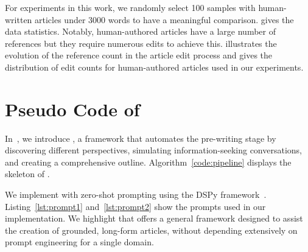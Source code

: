 For experiments in this work, we randomly select 100 samples with human-written articles under 3000 words to have a meaningful comparison.  gives the data statistics. Notably, human-authored articles have a large number of references but they require numerous edits to achieve this.  illustrates the evolution of the reference count in the article edit process and  gives the distribution of edit counts for human-authored articles used in our experiments.


\section{Pseudo Code of \system}
\label{appendix:pseudo_code}
In~, we introduce \system, a framework that automates the pre-writing stage by discovering different perspectives, simulating information-seeking conversations, and creating a comprehensive outline. Algorithm~\ref{code:pipeline} displays the skeleton of \system.

We implement \system with zero-shot prompting using the DSPy framework~\citep{khattab2023dspy}. Listing~\ref{lst:prompt1} and~\ref{lst:prompt2} show the prompts used in our implementation. We highlight that \system offers a general framework designed to assist the creation of grounded, long-form articles, without depending extensively on prompt engineering for a single domain.

